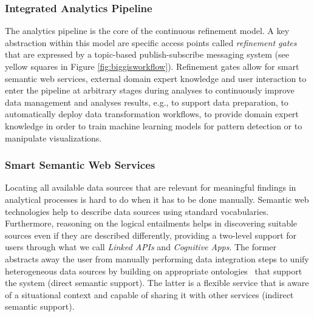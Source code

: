 \documentclass{sig-alternate-05-2015}
\begin{document}
\subsubsection{Integrated Analytics Pipeline}
The analytics pipeline is the core of the continuous refinement model. A key
abstraction within this model are specific access points called
\textit{refinement gates} that are expressed by a topic-based publish-subscribe
messaging system (see yellow squares in Figure \ref{fig:biggisworkflow}).
Refinement gates allow for smart semantic web services, external domain expert
knowledge and user interaction to enter the pipeline at arbitrary stages during
analyses to continuously improve data management and analyses results, e.g., to
support data preparation, to automatically deploy data transformation
workflows, to provide domain expert knowledge in order to train machine
learning models for pattern detection or to manipulate visualizations. 

\subsubsection{Smart Semantic Web Services}
Locating all available data sources that are relevant for meaningful findings
in analytical processes is hard to do when it has to be done manually. Semantic
web technologies help to describe data sources using standard vocabularies.
Furthermore, reasoning on the logical entailments helps in discovering suitable
sources even if they are described differently, providing a two-level support
for users through what we call \textit{Linked APIs} and \textit{Cognitive
Apps}. The former abstracts away the user from manually performing data
integration steps to unify heterogeneous data sources by building on
appropriate ontologies~\cite{Frank.2016b} that support the system (direct
semantic support). The latter is a flexible service that is aware of a
situational context and capable of sharing it with other services (indirect
semantic support).
\end{document}
